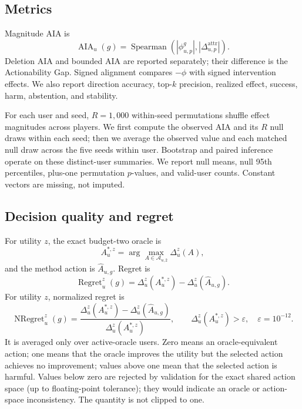 \documentclass[pdflatex,sn-basic,Numbered]{sn-jnl}
\theoremstyle{thmstyleone}
\theoremstyle{thmstyletwo}
\theoremstyle{thmstylethree}
\newcommand{\AIA}{\operatorname{AIA}}
\begin{document}
\subsection{Metrics}
Magnitude AIA is
\begin{equation}
\AIA_u(g)=\operatorname{Spearman}(|\phi^g_{u,p}|,|\Delta^{\mathrm{attr}}_{u,p}|).
\end{equation}
Deletion AIA and bounded AIA are reported separately; their difference is the Actionability Gap. Signed alignment compares $-\phi$ with signed intervention effects. We also report direction accuracy, top-$k$ precision, realized effect, success, harm, abstention, and stability.

For each user and seed, $R=1{,}000$ within-seed permutations shuffle effect magnitudes across players. We first compute the observed AIA and its $R$ null draws within each seed; then we average the observed value and each matched null draw across the five seeds within user. Bootstrap and paired inference operate on these distinct-user summaries. We report null means, null 95th percentiles, plus-one permutation $p$-values, and valid-user counts. Constant vectors are missing, not imputed.

\subsection{Decision quality and regret}
For utility $z$, the exact budget-two oracle is
\begin{equation}
A_u^{*,z}=\arg\max_{A\in\mathcal A_{u,2}}\Delta_u^z(A),
\end{equation}
and the method action is $\widehat A_{u,g}$. Regret is
\begin{equation}
\operatorname{Regret}_u^z(g)=\Delta_u^z(A_u^{*,z})-\Delta_u^z(\widehat A_{u,g}).
\end{equation}
For utility $z$, normalized regret is
\begin{equation}
\operatorname{NRegret}_u^z(g)=
\frac{\Delta_u^z(A_u^{*,z})-\Delta_u^z(\widehat A_{u,g})}
{\Delta_u^z(A_u^{*,z})},
\qquad \Delta_u^z(A_u^{*,z})>\varepsilon,
\quad \varepsilon=10^{-12}.
\end{equation}
It is averaged only over active-oracle users. Zero means an oracle-equivalent action; one means that the oracle improves the utility but the selected action achieves no improvement; values above one mean that the selected action is harmful. Values below zero are rejected by validation for the exact shared action space (up to floating-point tolerance); they would indicate an oracle or action-space inconsistency. The quantity is not clipped to one.
\end{document}
